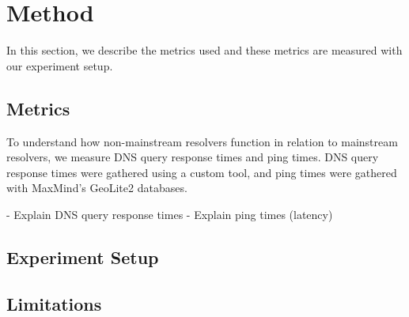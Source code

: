 \section{Method}\label{sec:method}

In this section, we describe the metrics used and these metrics are measured with our experiment setup.

\subsection{Metrics}
To understand how non-mainstream resolvers function in relation to mainstream resolvers, we measure DNS query response times and ping times. 
DNS query response times were gathered using a custom tool, and ping times were gathered with MaxMind's GeoLite2 databases.

- Explain DNS query response times
- Explain ping times (latency)

\subsection{Experiment Setup}

\subsection{Limitations}